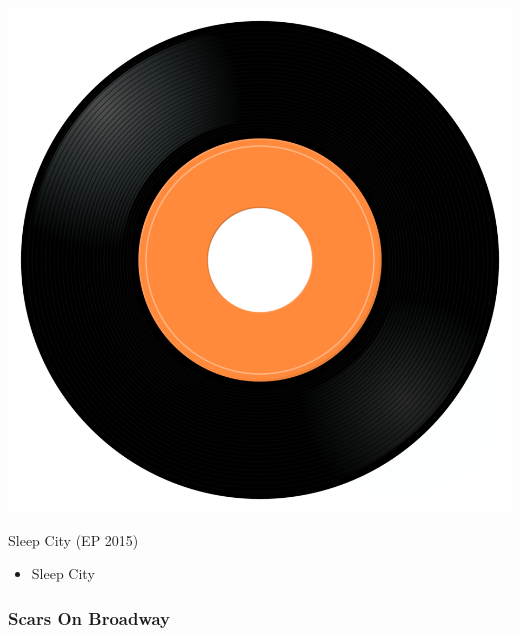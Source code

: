 \begin{minipage}[t]{0.25\textwidth}
\captionsetup{type=figure}
\includegraphics[width=\textwidth]{Images/cover.png}
\caption*{Sleep City (EP 2015)}
\end{minipage}
\begin{minipage}[t]{0.25\textwidth}\vspace{0pt}
\begin{itemize}[nosep,leftmargin=1em,labelwidth=*,align=left]
	\setlength{\itemsep}{0pt}
	\item Sleep City
\end{itemize}
\end{minipage}

\subsubsection{Scars On Broadway}


